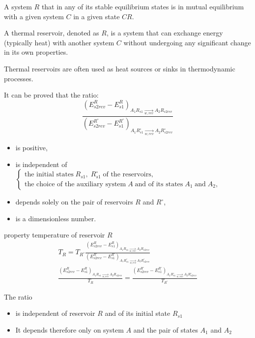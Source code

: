 \begin{defn}
    A system \( R \) that in any of its stable equilibrium states is 
    in mutual equilibrium with a given system \( C \) in a given state \( CR \).
    \begin{explain}
        A thermal reservoir, denoted as \(R\), 
        is a system that can exchange energy (typically heat) with another system 
    \(C\) without undergoing any significant change in its own properties.     
    \end{explain}
    \begin{zhu}
        Thermal reservoirs are often used as heat sources or sinks in thermodynamic processes. 
    \end{zhu}
\end{defn}
\begin{proposition}
    It can be proved that the ratio:
\[ \frac{(E_{s2rev}^R - E_{s1}^R)_{A_1 R_{s1} \underset{w,rev}{\rightarrow} A_2 R_{s2rev}}}
{(E_{s2rev}^{R^\circ } - E_{s1}^{R^\circ })_{A_1 R_{s1}^\circ \underset{w,rev}{\rightarrow} A_2 R^\circ _{s2rev} }} 
\]
\begin{itemize}
    \item is positive, 
    \item is independent of \(\begin{cases}
    \text{the initial states}\; R_{s1}, \;R^\circ_{s1}\; \text{of the reservoirs,}\\
    \text{the choice of the auxiliary system} \;A\; \text{and of its states} \; A_1 \;\text{and}\; A_2 , 
    \end{cases}\)
    \item depends solely on the pair of reservoirs \( R \) and \( R^\circ \),
    \item is a dimensionless number.
\end{itemize}
\end{proposition}
\begin{defn}
    property temperature of reservoir \(R\)
\begin{gather*}
T_R=T_{R^\circ}\frac{(E_{s2rev}^R - E_{s1}^R)_{A_1 R_{s1} \underset{w,rev}{\rightarrow} A_2 R_{s2rev}}}
{(E_{s2rev}^{R^\circ } - E_{s1}^{R^\circ })_{A_1 R_{s1}^\circ \underset{w,rev}{\rightarrow} A_2 R^\circ _{s2rev} }} 
\\
\frac{(E_{s2rev}^R - E_{s1}^R)_{A_1 R_{s1} \underset{w,rev}{\rightarrow} A_2 R_{s2rev}}}{T_R}
=\frac{(E_{s2rev}^{R^\circ } - E_{s1}^{R^\circ })_{A_1 R_{s1}^\circ \underset{w,rev}{\rightarrow} A_2 R^\circ _{s2rev}}}{T_{R^\circ}}
\end{gather*}

The ratio 
\begin{itemize}
    \item is independent of reservoir \( R \) and of its initial state \( R_{s1} \)
    \item It depends therefore only on system \( A \) and the pair of states \( A_1 \) and \( A_2 \)
\end{itemize}
\end{defn}
